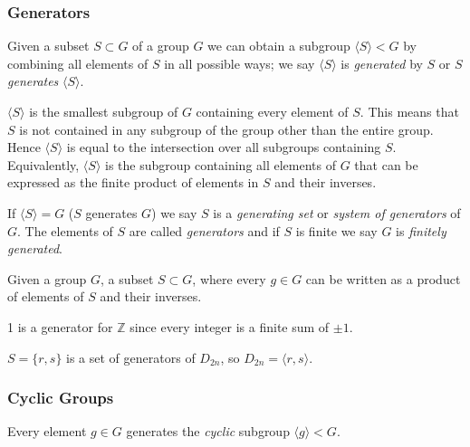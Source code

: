 \subsubsection{Generators}
Given a subset \(S \subset G\) of a group \(G\) we can obtain a subgroup \(\langle S \rangle < G\) by combining all elements of \(S\) in all possible ways; we say \(\langle S \rangle\) is \emph{generated} by \(S\) or \(S\) \emph{generates} \(\langle S\rangle\).

\(\langle S \rangle\) is the smallest subgroup of \(G\) containing every element of \(S\).
This means that \(S\) is not contained in any subgroup of the group other than the entire group.
Hence \(\langle S \rangle\) is equal to the intersection over all subgroups containing \(S\).
Equivalently, \(\langle S \rangle\) is the subgroup containing all elements of \(G\) that can be expressed as the finite product of elements in \(S\) and their inverses.

If \(\langle S \rangle = G\) (\(S\) generates \(G\)) we say \(S\) is a \emph{generating set} or \emph{system of generators} of \(G\).
The elements of \(S\) are called \emph{generators} and if \(S\) is finite we say \(G\) is \emph{finitely generated}.

\begin{definition}\label{def:gen_set_group}
   Given a group \(G\), a subset \(S \subset G\), where every \(g \in G\) can be written as a product of elements of \(S\) and their inverses.
\end{definition}
\begin{example}
   1 is a generator for \(\mathbb{Z}\) since every integer is a finite sum of \(\pm 1\).
\end{example}
\begin{example}
   \(S = \{r, s\}\) is a set of generators of \(D_{2n}\), so \(D_{2n} = \langle r, s \rangle\).
\end{example}

\subsubsection{Cyclic Groups}
Every element \(g \in G\) generates the \emph{cyclic} subgroup \(\langle g \rangle < G\).

